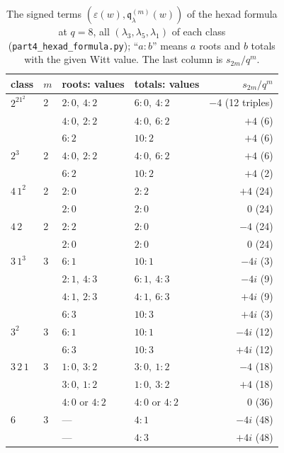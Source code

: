 \documentclass[12pt,a4paper]{amsart}
\theoremstyle{definition}
\newcommand{\eps}{\varepsilon}
\newcommand{\qq}{\mathfrak{q}}
\begin{document}
\begin{table}[htbp]
\centering
\caption{The signed terms $(\eps(w),\qq^{(m)}_\lambda(w))$ of the hexad formula at $q=8$, all $(\lambda_3,\lambda_5,\lambda_1)$ of each class (\texttt{part4\_hexad\_formula.py}); ``$a{:}b$'' means $a$ roots and $b$ totals with the given Witt value. The last column is $s_{2m}/q^m$.}\label{tab:hexadterms}
\small
\begin{tabular}{@{}llllr@{}}
\toprule
class & $m$ & roots: values & totals: values & $s_{2m}/q^m$\\
\midrule
$2^21^2$ & 2 & $2{:}0,\ 4{:}2$ & $6{:}0,\ 4{:}2$ & $-4$ (12 triples)\\
         &   & $4{:}0,\ 2{:}2$ & $4{:}0,\ 6{:}2$ & $+4$ (6)\\
         &   & $6{:}2$ & $10{:}2$ & $+4$ (6)\\
$2^3$    & 2 & $4{:}0,\ 2{:}2$ & $4{:}0,\ 6{:}2$ & $+4$ (6)\\
         &   & $6{:}2$ & $10{:}2$ & $+4$ (2)\\
$4\,1^2$ & 2 & $2{:}0$ & $2{:}2$ & $+4$ (24)\\
         &   & $2{:}0$ & $2{:}0$ & $0$ (24)\\
$4\,2$   & 2 & $2{:}2$ & $2{:}0$ & $-4$ (24)\\
         &   & $2{:}0$ & $2{:}0$ & $0$ (24)\\
$3\,1^3$ & 3 & $6{:}1$ & $10{:}1$ & $-4i$ (3)\\
         &   & $2{:}1,\ 4{:}3$ & $6{:}1,\ 4{:}3$ & $-4i$ (9)\\
         &   & $4{:}1,\ 2{:}3$ & $4{:}1,\ 6{:}3$ & $+4i$ (9)\\
         &   & $6{:}3$ & $10{:}3$ & $+4i$ (3)\\
$3^2$    & 3 & $6{:}1$ & $10{:}1$ & $-4i$ (12)\\
         &   & $6{:}3$ & $10{:}3$ & $+4i$ (12)\\
$3\,2\,1$& 3 & $1{:}0,\ 3{:}2$ & $3{:}0,\ 1{:}2$ & $-4$ (18)\\
         &   & $3{:}0,\ 1{:}2$ & $1{:}0,\ 3{:}2$ & $+4$ (18)\\
         &   & $4{:}0$ or $4{:}2$ & $4{:}0$ or $4{:}2$ & $0$ (36)\\
$6$      & 3 & --- & $4{:}1$ & $-4i$ (48)\\
         &   & --- & $4{:}3$ & $+4i$ (48)\\
\bottomrule
\end{tabular}
\end{table}
\end{document}
